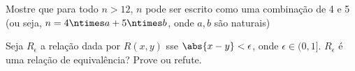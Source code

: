 \begin{exercise}
Mostre que para todo $n \gt 12$, $n$ pode ser escrito como uma combinação de 4 e 5 (ou seja, $n = 4 \ntimes a + 5 \ntimes b$, onde $a, b$ são naturais)
\end{exercise}

\begin{exercise}
Seja $R_\epsilon$ a relação dada por $R(x, y)$ sse $\abs{x - y} < \epsilon$, onde $\epsilon \in (0, 1]$.
$R_\epsilon$ é uma relação de equivalência? Prove ou refute. 
\end{exercise}